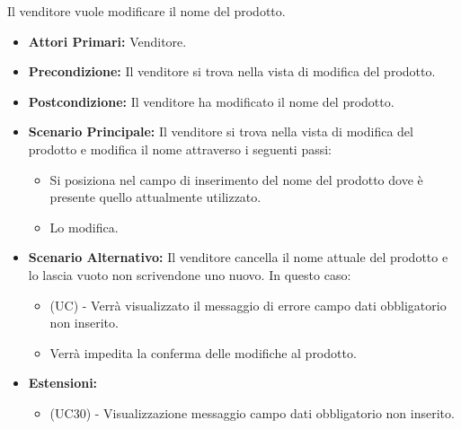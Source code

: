 Il venditore vuole modificare il nome del prodotto.
\begin{itemize}
    \item \textbf{Attori Primari:} Venditore.
    \item \textbf{Precondizione:} Il venditore si trova nella vista di modifica del prodotto.
    \item \textbf{Postcondizione:} Il venditore ha modificato il nome del prodotto.
    \item \textbf{Scenario Principale:} Il venditore si trova nella vista di modifica del prodotto e modifica il nome attraverso i seguenti passi:
    \begin{itemize}
        \item Si posiziona nel campo di inserimento del nome del prodotto dove è presente quello attualmente utilizzato.
        \item Lo modifica.
    \end{itemize}
    \item \textbf{Scenario Alternativo:} Il venditore cancella il nome attuale del prodotto e lo lascia vuoto non scrivendone uno nuovo. In questo caso:
    \begin{itemize}
        \item (UC) - Verrà visualizzato il messaggio di errore campo dati obbligatorio non inserito.
        \item Verrà impedita la conferma delle modifiche al prodotto.
    \end{itemize}
    \item \textbf{Estensioni:}
    \begin{itemize}
        \item (UC30) - Visualizzazione messaggio campo dati obbligatorio non inserito.
    \end{itemize}
\end{itemize}

